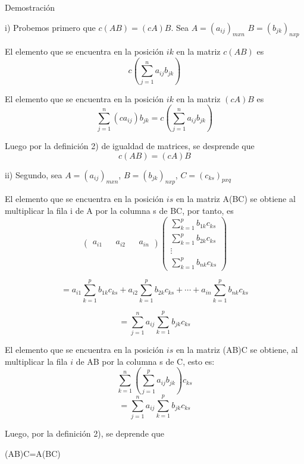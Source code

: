\documentclass[twocolumn]{article}
\begin{document}
Demostraci\'on

i) Probemos primero que $c(AB)=(cA)B$. Sea $A = (a_{ij})_{mxn}$ $B = (b_{jk})_{nxp}$

El elemento que se encuentra en la posici\'on $ik$ en la matriz $c(AB)$ es
$$ c(\displaystyle\sum_{j=1}^n a_{ij}b_{jk})$$

El elemento que se encuentra en la posici\'on $ik$ en la matriz $(cA)B$ es
$$ \displaystyle\sum_{j=1}^n (ca_{ij})b_{jk} = c(\displaystyle\sum_{j=1}^n a_{ij}b_{jk}) $$

Luego por la definici\'on 2) de igualdad de matrices, se desprende que $$c(AB)=(cA)B$$

ii) Segundo, sea $A = (a_{ij})_{mxn}$, $B = (b_{jk})_{nxp}$, $C = (c_{ks})_{pxq}$

El elemento que se encuentra en la posici\'on $is$ en la matriz A(BC) se obtiene al multiplicar la fila i de A por la columna s de BC, por tanto, es
$$ \begin{pmatrix}
a_{i1} && a_{i2} && a_{in}
\end{pmatrix}
\begin{pmatrix}
\displaystyle\sum_{k=1}^p b_{1k}c_{ks} \\
\displaystyle\sum_{k=1}^p b_{2k}c_{ks} \\
\vdots \\
\displaystyle\sum_{k=1}^p b_{nk}c_{ks} 
\end{pmatrix} $$

$$ = a_{i1} \displaystyle\sum_{k=1}^p b_{1k}c_{ks} + a_{i2} \displaystyle\sum_{k=1}^p b_{2k}c_{ks} + \cdots + a_{in} \displaystyle\sum_{k=1}^p b_{nk}c_{ks}$$

$$ = \displaystyle\sum_{j=1}^n a_{ij} \displaystyle\sum_{k=1}^p b_{jk}c_{ks} $$

El elemento que se encuentra en la posici\'on $is$ en la matriz (AB)C se obtiene, al multiplicar la fila $i$ de AB por la columna s de C, esto es:
$$\displaystyle\sum_{k=1}^n (\displaystyle\sum_{j=1}^p a_{ij}b_{jk})c_{ks}$$
$$ = \displaystyle\sum_{j=1}^n a_{ij} \displaystyle\sum_{k=1}^p b_{jk}c_{ks} $$

Luego, por la definici\'on 2), se deprende que 
\begin{center}
(AB)C=A(BC)
\end{center}
\end{document}

